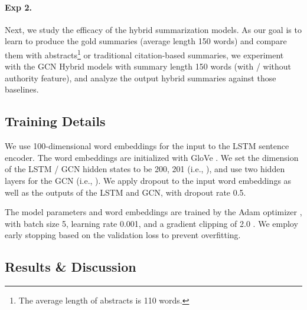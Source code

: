\documentclass[letterpaper]{article} \usepackage{aaai19}  \usepackage{times}  \usepackage{helvet}  \usepackage{courier}  \usepackage{url}
\begin{document}
\paragraph{Exp 2.}
Next,
we study the efficacy of the hybrid summarization models.
As our goal is to learn to produce the gold summaries
(average length 150 words)
and compare them with abstracts\footnote{The average length of abstracts is 110 words.} or
traditional citation-based summaries,
we experiment with the GCN Hybrid models with summary length 150 words (with \!/\! without authority feature), and analyze the output hybrid summaries against those baselines.


\subsection{Training Details}

We use 100-dimensional word embeddings for the input to the LSTM sentence encoder.
The word embeddings are initialized with
GloVe \cite{pennington-socher-manning:2014:EMNLP2014}.
We set the dimension of the LSTM \!/\! GCN hidden states to be 200, 201 (i.e., \scalebox{1}{}), and use two hidden layers for the GCN (i.e., \scalebox{1}{}).
We apply dropout \cite{JMLR:v15:srivastava14a} to the input word embeddings as well as the outputs of the LSTM and GCN, with dropout rate 0.5.



The model parameters and word embeddings are trained by the Adam optimizer \cite{kingma2015adam}, with batch size 5, learning rate 0.001, and a gradient clipping of 2.0 \cite{Pascanu2012}.
We employ early stopping \cite{caruana2001overfitting} based on the validation loss to prevent overfitting.






\subsection{Results \& Discussion}
\end{document}
